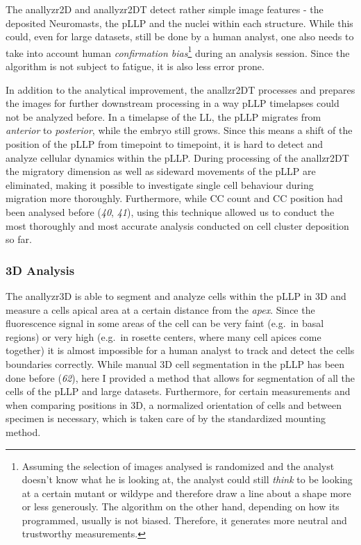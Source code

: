 \documentclass[10pt, b5paper, singlespacinge, twoside]{reedthesis} %
\theoremstyle{definition}
\theoremstyle{definition}
\theoremstyle{definition}
\theoremstyle{remark}
\begin{document}
The anallyzr2D and anallyzr2DT detect rather simple image features - the deposited Neuromasts, the pLLP and the nuclei within each structure. While this could, even for large datasets, still be done by a human analyst, one also needs to take into account human \emph{confirmation bias}\footnote{Assuming the selection of images analysed is randomized and the analyst doesn't know what he is looking at, the analyst could still \emph{think} to be looking at a certain mutant or wildype and therefore draw a line about a shape more or less generously. The algorithm on the other hand, depending on how its programmed, usually is not biased. Therefore, it generates more neutral and trustworthy measurements.} during an analysis session. Since the algorithm is not subject to fatigue, it is also less error prone.

In addition to the analytical improvement, the anallzr2DT processes and prepares the images for further downstream processing in a way pLLP timelapses could not be analyzed before. In a timelapse of the LL, the pLLP migrates from \emph{anterior} to \emph{posterior}, while the embryo still grows. Since this means a shift of the position of the pLLP from timepoint to timepoint, it is hard to detect and analyze cellular dynamics within the pLLP. During processing of the anallzr2DT the migratory dimension as well as sideward movements of the pLLP are eliminated, making it possible to investigate single cell behaviour during migration more thoroughly. Furthermore, while CC count and CC position had been analysed before (\emph{40}, \emph{41}), using this technique allowed us to conduct the most thoroughly and most accurate analysis conducted on cell cluster deposition so far.

\hypertarget{d-analysis-1}{%
\subsubsection{3D Analysis}\label{d-analysis-1}}

The anallyzr3D is able to segment and analyze cells within the pLLP in 3D and measure a cells apical area at a certain distance from the \emph{apex}. Since the fluorescence signal in some areas of the cell can be very faint (e.g.~in basal regions) or very high (e.g.~in rosette centers, where many cell apices come together) it is almost impossible for a human analyst to track and detect the cells boundaries correctly. While manual 3D cell segmentation in the pLLP has been done before (\emph{62}), here I provided a method that allows for segmentation of all the cells of the pLLP and large datasets. Furthermore, for certain measurements and when comparing positions in 3D, a normalized orientation of cells and between specimen is necessary, which is taken care of by the standardized mounting method.
\end{document}
